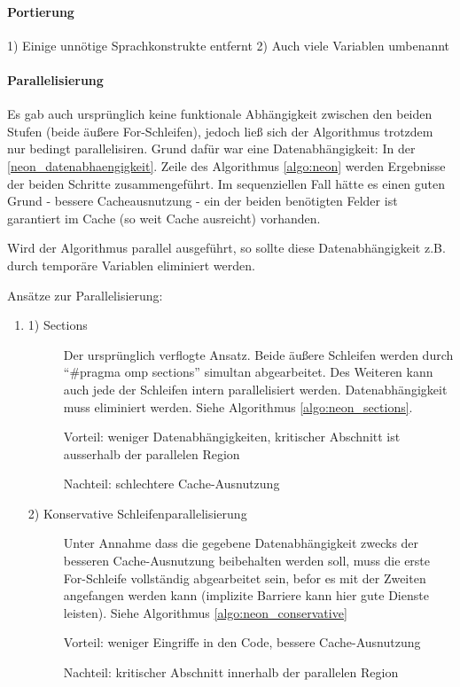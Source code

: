 \paragraph{Portierung}
\label{neon_portierung}
1) Einige unnötige Sprachkonstrukte entfernt
2) Auch viele Variablen umbenannt

\paragraph{Parallelisierung}
Es gab auch ursprünglich keine funktionale Abhängigkeit zwischen den beiden Stufen (beide äußere For-Schleifen),  jedoch ließ sich der Algorithmus trotzdem nur bedingt parallelisiren. Grund dafür war eine Datenabhängigkeit: In der \ref{neon_datenabhaengigkeit}. Zeile des Algorithmus \ref{algo:neon} werden Ergebnisse der beiden Schritte zusammengeführt. Im sequenziellen Fall hätte es einen guten Grund - bessere Cacheausnutzung - ein der beiden benötigten Felder ist garantiert im Cache (so weit Cache ausreicht) vorhanden.

Wird der Algorithmus parallel ausgeführt, so sollte diese Datenabhängigkeit z.B. durch temporäre Variablen eliminiert werden. 

Ansätze zur Parallelisierung:
\begin{enumerate}
	\item [] \begin{description} %
		\item[1) Sections] Der ursprünglich verflogte Ansatz. Beide äußere Schleifen werden durch ``\#pragma omp sections'' simultan abgearbeitet. Des Weiteren kann auch jede der Schleifen intern parallelisiert werden. Datenabhängigkeit muss eliminiert werden. Siehe Algorithmus \ref{algo:neon_sections}.
		
		Vorteil: weniger Datenabhängigkeiten, kritischer Abschnitt ist ausserhalb der parallelen Region
		
		Nachteil: schlechtere Cache-Ausnutzung
		\item[2) Konservative Schleifenparallelisierung] Unter Annahme dass die gegebene Datenabhängigkeit zwecks der besseren Cache-Ausnutzung beibehalten werden soll, muss die erste For-Schleife vollständig abgearbeitet sein, befor es mit der Zweiten angefangen werden kann (implizite Barriere kann hier gute Dienste leisten). Siehe Algorithmus \ref{algo:neon_conservative}
		
		Vorteil: weniger Eingriffe in den Code, bessere Cache-Ausnutzung
		
		Nachteil: kritischer Abschnitt innerhalb der parallelen Region 
	\end{description}
\end{enumerate}


